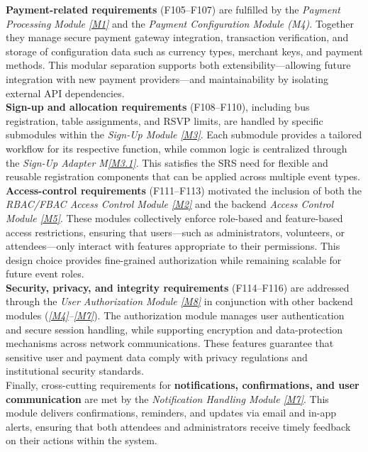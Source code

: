 \documentclass[12pt, titlepage]{article}
\newcommand{\mref}[1]{M\ref{#1}}
\begin{document}
\noindent
\textbf{Payment-related requirements} (F105–F107) are fulfilled by the
\textit{Payment Processing Module \ref{M1}} and the \textit{Payment Configuration Module
(M4)}. Together they manage secure payment gateway integration, transaction verification,
and storage of configuration data such as currency types, merchant keys, and payment
methods. This modular separation supports both extensibility—allowing future integration
with new payment providers—and maintainability by isolating external API dependencies. \\

\noindent
\textbf{Sign-up and allocation requirements} (F108–F110), including bus registration,
table assignments, and RSVP limits, are handled by specific submodules within the
\textit{Sign-Up Module \ref{M3}}. Each submodule provides a tailored workflow for its
respective function, while common logic is centralized through the \textit{Sign-Up
Adapter \mref{M3.1}}. This satisfies the SRS need for flexible and reusable registration
components that can be applied across multiple event types.\\

\noindent
\textbf{Access-control requirements} (F111–F113) motivated the inclusion of both the
\textit{RBAC/FBAC Access Control Module \ref{M2}} and the backend
\textit{Access Control Module \ref{M5}}. These modules collectively enforce role-based and
feature-based access restrictions, ensuring that users—such as administrators, volunteers,
or attendees—only interact with features appropriate to their permissions. This design
choice provides fine-grained authorization while remaining scalable for future event roles.\\

\noindent
\textbf{Security, privacy, and integrity requirements} (F114–F116) are addressed through
the \textit{User Authorization Module \ref{M8}} in conjunction with other backend modules
(\textit{\ref{M4}–\ref{M7}}). The authorization module manages user authentication and secure session
handling, while supporting encryption and data-protection mechanisms across network
communications. These features guarantee that sensitive user and payment data comply with
privacy regulations and institutional security standards.\\

\noindent
Finally, cross-cutting requirements for \textbf{notifications, confirmations, and user
communication} are met by the \textit{Notification Handling Module \ref{M7}}. This module
delivers confirmations, reminders, and updates via email and in-app alerts, ensuring that
both attendees and administrators receive timely feedback on their actions within the
system. \\
\end{document}
